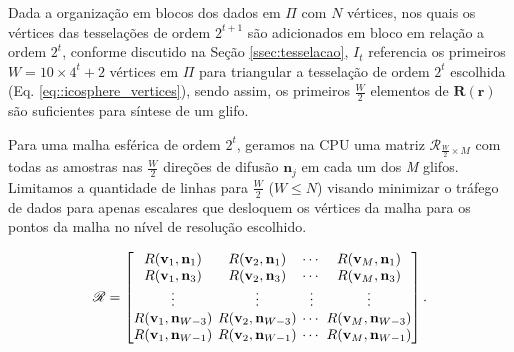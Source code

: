 Dada a organização em blocos dos dados em $\Pi$ com $N$ vértices, nos quais os vértices das tesselações de ordem $2^{t+1}$ são adicionados em bloco em relação a ordem $2^t$, conforme discutido na Seção \ref{ssec:tesselacao}, $I_t$ referencia os primeiros $W = 10 \times 4^t + 2$ vértices em $\Pi$ para triangular a tesselação de ordem $2^t$ escolhida (Eq. \ref{eq::icosphere_vertices}), sendo assim, os primeiros $\frac{W}{2}$ elementos de $\boldsymbol{R}(\mathbf{r})$ são suficientes para síntese de um glifo.

Para uma malha esférica de ordem $2^t$, geramos na CPU uma matriz $\boldsymbol{\mathscr{R}}_{\frac{W}{2} \times M}$ com todas as amostras nas $\frac{W}{2}$ direções de difusão $\mathbf{n}_j$ em cada um dos \textit{M} glifos. Limitamos a quantidade de linhas para $\frac{W}{2}$ ($W \leq N$) visando minimizar o tráfego de dados para apenas escalares que desloquem os vértices da malha para os pontos da malha no nível de resolução escolhido.


\begin{equation}
\label{eq::R}
\boldsymbol{\mathscr{R}} = 
\begingroup %
\setlength\arraycolsep{2pt}
\begin{bmatrix} 
    R(\mathbf{v}_{1}, \mathbf{n}_1) &
    R(\mathbf{v}_{2}, \mathbf{n}_1) & \cdots & 
    R(\mathbf{v}_{M}, \mathbf{n}_1)  \\
    
    R(\mathbf{v}_{1}, \mathbf{n}_3) &
    R(\mathbf{v}_{2}, \mathbf{n}_3) & \cdots & 
    R(\mathbf{v}_{M}, \mathbf{n}_{3}) \\ \vdots & \vdots & \vdots & \vdots  \\
    
    R(\mathbf{v}_{1}, \mathbf{n}_{W-3}) &
    R(\mathbf{v}_{2}, \mathbf{n}_{W-3}) & \cdots & 
    R(\mathbf{v}_{M}, \mathbf{n}_{W-3})  \\
    
    R(\mathbf{v}_{1}, \mathbf{n}_{W-1}) & 
    R(\mathbf{v}_{2}, \mathbf{n}_{W-1}) & \cdots & 
    R(\mathbf{v}_{M}, \mathbf{n}_{W-1})
\end{bmatrix}.
\endgroup
\end{equation}

